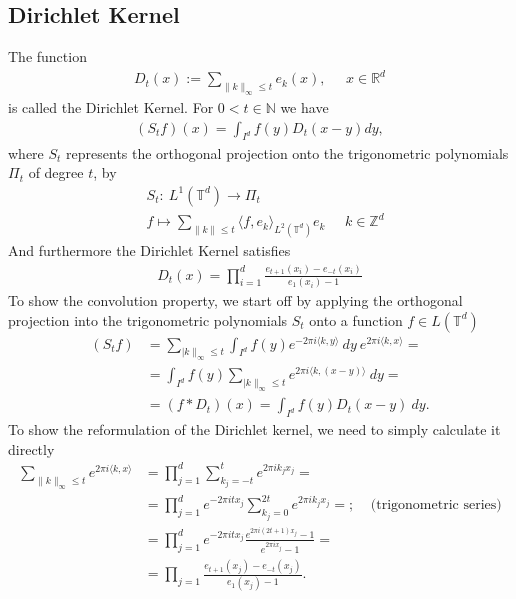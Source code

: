\subsection{Dirichlet Kernel}
The function
\begin{align}
    D_t(x) := \sum_{\lVert k \rVert_\infty \leq t} e_k(x), \;\;\;\;\; x\in
    \mathbb{R}^d
\end{align}
is called the Dirichlet Kernel. For $0 < t \in \mathbb{N}$ we have
\begin{align}
    (S_tf)(x) = \int_{I^d} f(y) D_t(x-y) dy,
\end{align}
where $S_t$ represents the orthogonal projection onto the trigonometric
polynomials $\Pi_t$ of degree $t$, by
\begin{align}
    &S_t:\ L^1(\mathbb{T}^d) \rightarrow \Pi_t \\
    &f \mapsto \sum_{\lVert k \rVert \leq t} \langle f,
    e_k\rangle_{L^2(\mathbb{T}^d)} e_k \;\;\;\;\; k \in \mathbb{Z}^d
\end{align}
And furthermore the Dirichlet Kernel satisfies
\begin{align}
    D_t(x) = \prod_{i=1}^d \frac{e_{t+1}(x_i) - e_{-t}(x_i)}{e_1(x_i) - 1}
\end{align}
To show the convolution property, we start off by applying the orthogonal
projection into the trigonometric polynomials $S_t$ onto a function $f \in
L(\mathbb{T}^d)$
\begin{align}
    (S_tf) &= \sum_{\lvert k\rVert_\infty \leq t} \int_{I^d} f(y) e^{-2\pi i
    \langle k, y\rangle}\ dy\ e^{2\pi i\langle k, x\rangle} =\\
    &= \int_{I^d}f(y) \sum_{\lvert k\rVert_\infty \leq t} e^{2\pi i \langle
    k, (x- y)\rangle}\ dy =\\
    &= (f * D_t) (x) = \int_{I^d} f(y) D_t(x - y)\ dy.
\end{align}
To show the reformulation of the Dirichlet kernel, we need to simply
calculate it directly
\begin{align}
    \sum_{\lVert k \rVert_\infty \leq t} e^{2\pi i \langle k , x\rangle} &=
    \prod_{j=1}^d \sum_{k_j = -t}^t e^{2\pi i k_j x_j} =\\
    &= \prod_{j=1}^d e^{-2\pi i t x_j} \sum_{k_j = 0}^{2t} e^{2\pi i k_j
        x_j}=;\;\;\;\; \text{(trigonometric series)}\\
    &= \prod_{j=1}^d e^{-2\pi i t x_j} \frac{e^{2\pi i (2t + 1)x_j} -
    1}{e^{2\pi i x_j} - 1} =\\
    &= \prod_{j = 1} \frac{e_{t+1}(x_j) - e_{-t}(x_j)}{e_1(x_j) - 1}.
\end{align}

